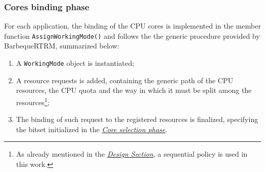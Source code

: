 \subsubsection{Cores binding phase}
For each application, the binding of the CPU cores is implemented in the member function \verb|AssignWorkingMode()| and follows the the generic procedure provided by BarbequeRTRM, summarized below:
\begin{enumerate}
    \item A \verb|WorkingMode| object is instantiated;
    \item A resource requests is added, containing the generic path of the  CPU resources, the CPU quota and the way in which it must be split among the resources\cprotect\footnote{As already mentioned in the {\hyperref[sec:poldesign]{\emph{Design Section}}}, a sequential policy is used in this work.};
    \item The binding of such request to the registered resources is finalized, specifying the bitset initialized in the {\hyperref[sec:coresel]{\emph{Core selection phase}}}.
\end{enumerate}
